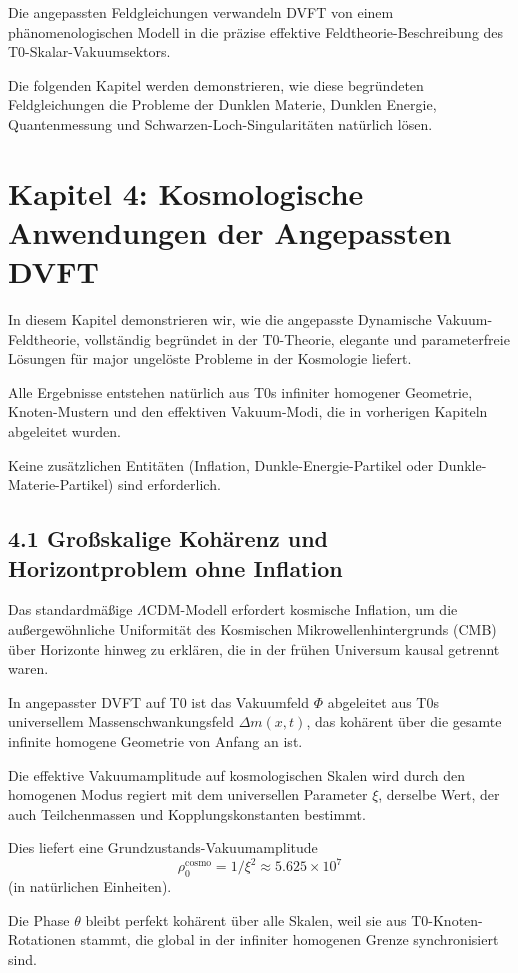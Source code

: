 \documentclass[12pt,a4paper]{article}
\begin{document}
	Die angepassten Feldgleichungen verwandeln DVFT von einem phänomenologischen Modell in die präzise effektive Feldtheorie-Beschreibung des T0-Skalar-Vakuumsektors.
	
	Die folgenden Kapitel werden demonstrieren, wie diese begründeten Feldgleichungen die Probleme der Dunklen Materie, Dunklen Energie, Quantenmessung und Schwarzen-Loch-Singularitäten natürlich lösen.
	
	\section{Kapitel 4: Kosmologische Anwendungen der Angepassten DVFT}
	
	In diesem Kapitel demonstrieren wir, wie die angepasste Dynamische Vakuum-Feldtheorie, vollständig begründet in der T0-Theorie, elegante und parameterfreie Lösungen für major ungelöste Probleme in der Kosmologie liefert.
	
	Alle Ergebnisse entstehen natürlich aus T0s infiniter homogener Geometrie, Knoten-Mustern und den effektiven Vakuum-Modi, die in vorherigen Kapiteln abgeleitet wurden.
	
	Keine zusätzlichen Entitäten (Inflation, Dunkle-Energie-Partikel oder Dunkle-Materie-Partikel) sind erforderlich.
	
	\subsection{4.1 Großskalige Kohärenz und Horizontproblem ohne Inflation}
	
	Das standardmäßige $\Lambda$CDM-Modell erfordert kosmische Inflation, um die außergewöhnliche Uniformität des Kosmischen Mikrowellenhintergrunds (CMB) über Horizonte hinweg zu erklären, die in der frühen Universum kausal getrennt waren.
	
	In angepasster DVFT auf T0 ist das Vakuumfeld $\Phi$ abgeleitet aus T0s universellem Massenschwankungsfeld $\Delta m(x,t)$, das kohärent über die gesamte infinite homogene Geometrie von Anfang an ist.
	
	Die effektive Vakuumamplitude auf kosmologischen Skalen wird durch den homogenen Modus regiert mit dem universellen Parameter $\xi$, derselbe Wert, der auch Teilchenmassen und Kopplungskonstanten bestimmt.
	
	Dies liefert eine Grundzustands-Vakuumamplitude
	\[
	\rho_0^{\text{cosmo}} = 1 / \xi^2 \approx 5.625 \times 10^7
	\]
	(in natürlichen Einheiten).
	
	Die Phase $\theta$ bleibt perfekt kohärent über alle Skalen, weil sie aus T0-Knoten-Rotationen stammt, die global in der infiniter homogenen Grenze synchronisiert sind.
	
\end{document}
